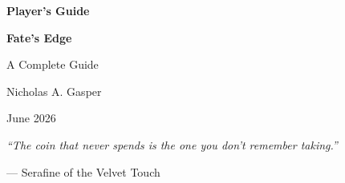 \begin{titlepage}
\centering
\vspace*{1cm}

{\Huge\bfseries Player's Guide\par}
\vspace{0.3cm}
{\Large\bfseries Fate's Edge\par}
\vspace{0.5cm}
{\large A Complete Guide\par}
\vspace{2cm}

{\large Nicholas A. Gasper\par}
\vspace{0.3cm}
{\large June 2026\par}

\vfill
{\large \textit{``The coin that never spends is the one you don't remember taking.''}\par}
\vspace{0.2cm}
{\large --- Serafine of the Velvet Touch\par}

\end{titlepage}
